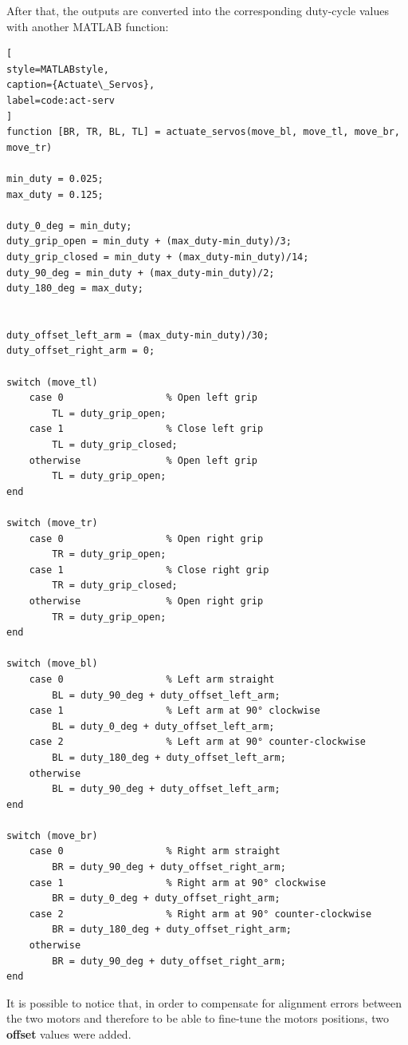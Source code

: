 \documentclass{report}
\begin{document}
\bigskip

After that, the outputs are converted into the corresponding duty-cycle values with another MATLAB function:
\begin{lstlisting}[
style=MATLABstyle,
caption={Actuate\_Servos},
label=code:act-serv
] 
function [BR, TR, BL, TL] = actuate_servos(move_bl, move_tl, move_br, move_tr)

min_duty = 0.025;
max_duty = 0.125;

duty_0_deg = min_duty;
duty_grip_open = min_duty + (max_duty-min_duty)/3;
duty_grip_closed = min_duty + (max_duty-min_duty)/14; 
duty_90_deg = min_duty + (max_duty-min_duty)/2;
duty_180_deg = max_duty;


duty_offset_left_arm = (max_duty-min_duty)/30;
duty_offset_right_arm = 0;

switch (move_tl)
    case 0                  % Open left grip
        TL = duty_grip_open;
    case 1                  % Close left grip
        TL = duty_grip_closed;
    otherwise               % Open left grip
        TL = duty_grip_open;
end

switch (move_tr)
    case 0                  % Open right grip
        TR = duty_grip_open;
    case 1                  % Close right grip
        TR = duty_grip_closed;
    otherwise               % Open right grip
        TR = duty_grip_open;
end

switch (move_bl)
    case 0                  % Left arm straight
        BL = duty_90_deg + duty_offset_left_arm;
    case 1                  % Left arm at 90° clockwise
        BL = duty_0_deg + duty_offset_left_arm;
    case 2                  % Left arm at 90° counter-clockwise
        BL = duty_180_deg + duty_offset_left_arm;
    otherwise
        BL = duty_90_deg + duty_offset_left_arm;
end

switch (move_br)
    case 0                  % Right arm straight
        BR = duty_90_deg + duty_offset_right_arm;
    case 1                  % Right arm at 90° clockwise
        BR = duty_0_deg + duty_offset_right_arm;
    case 2                  % Right arm at 90° counter-clockwise
        BR = duty_180_deg + duty_offset_right_arm;
    otherwise
        BR = duty_90_deg + duty_offset_right_arm;
end

\end{lstlisting}
It is possible to notice that, in order to compensate for alignment errors between the two motors and therefore to be able to fine-tune the motors positions, two \textbf{offset} values were added.
\end{document}
